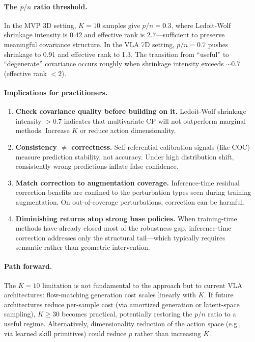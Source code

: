 \documentclass[letterpaper]{article}
\begin{document}
\paragraph{The $p/n$ ratio threshold.}
In the MVP 3D setting, $K{=}10$ samples give $p/n = 0.3$, where Ledoit-Wolf shrinkage intensity is 0.42 and effective rank is 2.7---sufficient to preserve meaningful covariance structure. In the VLA 7D setting, $p/n = 0.7$ pushes shrinkage to 0.91 and effective rank to 1.3. The transition from ``useful'' to ``degenerate'' covariance occurs roughly when shrinkage intensity exceeds $\sim$0.7 (effective rank $< 2$).

\paragraph{Implications for practitioners.}
\begin{enumerate}[nosep]
\item \textbf{Check covariance quality before building on it.} Ledoit-Wolf shrinkage intensity $> 0.7$ indicates that multivariate CP will not outperform marginal methods. Increase $K$ or reduce action dimensionality.
\item \textbf{Consistency $\neq$ correctness.} Self-referential calibration signals (like COC) measure prediction stability, not accuracy. Under high distribution shift, consistently wrong predictions inflate false confidence.
\item \textbf{Match correction to augmentation coverage.} Inference-time residual correction benefits are confined to the perturbation types seen during training augmentation. On out-of-coverage perturbations, correction can be harmful.
\item \textbf{Diminishing returns atop strong base policies.} When training-time methods have already closed most of the robustness gap, inference-time correction addresses only the structural tail---which typically requires semantic rather than geometric intervention.
\end{enumerate}

\paragraph{Path forward.}
The $K{=}10$ limitation is not fundamental to the approach but to current VLA architectures: flow-matching generation cost scales linearly with $K$. If future architectures reduce per-sample cost (via amortized generation or latent-space sampling), $K \geq 30$ becomes practical, potentially restoring the $p/n$ ratio to a useful regime. Alternatively, dimensionality reduction of the action space (e.g., via learned skill primitives) could reduce $p$ rather than increasing $K$.
\end{document}

